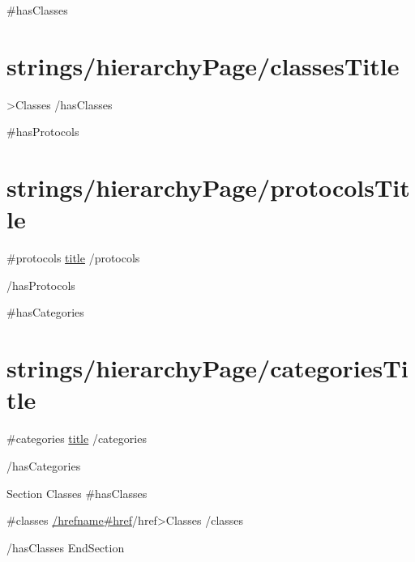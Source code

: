 {{#hasClasses}}
\section{{{strings/hierarchyPage/classesTitle}}}
\label{hierarchy/classes}
	{{>Classes}}
{{/hasClasses}}

{{#hasProtocols}}
\section{{{strings/hierarchyPage/protocolsTitle}}}
\label{hierarchy/protocols}
\begin{itemize}
{{#protocols}}
	\list \hyperlink{{{href}}}{{{title}}}
{{/protocols}}
\end{itemize}
{{/hasProtocols}}

{{#hasCategories}}
\section{{{strings/hierarchyPage/categoriesTitle}}}
\label{hierarchy/categories}
\begin{itemize}
{{#categories}}
	\list \hyperlink{{{href}}}{{{title}}}
{{/categories}}
\end{itemize}
{{/hasCategories}}

Section Classes
{{#hasClasses}}
	\begin{itemize}
	{{#classes}}
		\hyperlink{{{href}}}{{{/href}}{{name}}{{#href}}}{{/href}}{{>Classes}}
	{{/classes}}
	\end{itemize}
{{/hasClasses}}
EndSection
